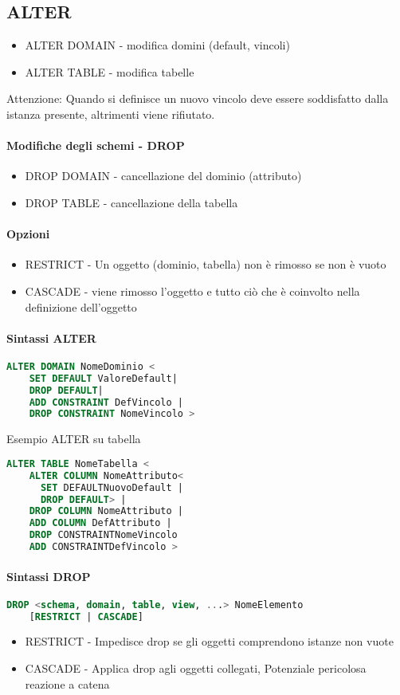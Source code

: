 \subsection{ALTER}
\begin{itemize}
  \item ALTER DOMAIN - modifica domini (default, vincoli)
  \item ALTER TABLE - modifica tabelle
\end{itemize}
Attenzione: Quando si definisce un nuovo vincolo deve essere soddisfatto dalla istanza 
presente, altrimenti viene rifiutato.
\paragraph*{Modifiche degli schemi - DROP}
\begin{itemize}
  \item DROP DOMAIN - cancellazione del dominio (attributo)
  \item DROP TABLE - cancellazione della tabella
\end{itemize}
\paragraph*{Opzioni}
\begin{itemize}
  \item RESTRICT - Un oggetto (dominio, tabella) non è rimosso se non è vuoto
  \item CASCADE - viene rimosso l'oggetto e tutto ciò che è coinvolto
  nella definizione dell'oggetto
\end{itemize}
\paragraph*{Sintassi ALTER}
\begin{lstlisting}[language=SQL]
  ALTER DOMAIN NomeDominio <
    SET DEFAULT ValoreDefault|
    DROP DEFAULT|
    ADD CONSTRAINT DefVincolo |
    DROP CONSTRAINT NomeVincolo >
\end{lstlisting}
Esempio ALTER su tabella
\begin{lstlisting}[language=SQL]
  ALTER TABLE NomeTabella <
    ALTER COLUMN NomeAttributo<
      SET DEFAULTNuovoDefault |
      DROP DEFAULT> |
    DROP COLUMN NomeAttributo |
    ADD COLUMN DefAttributo |
    DROP CONSTRAINTNomeVincolo
    ADD CONSTRAINTDefVincolo >
\end{lstlisting}
\paragraph*{Sintassi DROP}
\begin{lstlisting}[language=SQL]
  DROP <schema, domain, table, view, ...> NomeElemento
    [RESTRICT | CASCADE]
\end{lstlisting}
\begin{itemize}
  \item RESTRICT - Impedisce drop se gli oggetti comprendono istanze non vuote
  \item CASCADE - Applica drop agli oggetti collegati, Potenziale pericolosa reazione
  a catena
\end{itemize}
